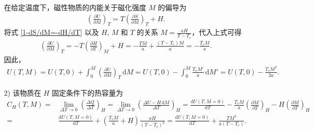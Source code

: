\documentclass{assignment}
\begin{document}
\begin{sol}
\begin{itemize}
        在给定温度下，磁性物质的内能关于磁化强度 $M$ 的偏导为
        \begin{align}
            \left(\frac{\partial U}{\partial M}\right)_T=T\left(\frac{\partial S}{\partial M}\right)_T+H.
        \end{align}
        将式 \eqref{1-dS/dM=-dH/dT} 以及 $H$, $M$ 和 $T$ 的关系 $M=\frac{aH}{T-T_c}$，代入上式可得
        \begin{align}
            \label{1-dU/dM}
            \left(\frac{\partial U}{\partial M}\right)_T=-T\left(\frac{\partial H}{\partial T}\right)_M+H=-\frac{TM}{a}+\frac{(T-T_c)M}{a}=-\frac{T_cM}{a}.
        \end{align}
        因此，
        \begin{align}
            U(T,M)=U(T,0)+\int_0^M\left(\frac{\partial U}{\partial M}\right)_T\,\mathrm{d}M=U(T,0)-\int_0^M\frac{T_cM'}{a}\,\mathrm{d}M'=U(T,0)-\frac{T_cM^2}{2a}.
        \end{align}
        \item[2)] 该物质在 $H$ 固定条件下的热容量为
        \begin{align}
            C_H(T,M)=&\lim_{\Delta T\rightarrow 0}\left(\frac{\Delta Q}{\Delta T}\right)_H=\lim_{\Delta T\rightarrow 0}\left(\frac{\Delta U-H\,\mathrm{d}M}{\Delta T}\right)_H=\frac{\mathrm{d}U(T,M=0)}{\mathrm{d}T}-\frac{T_cM}{a}\left(\frac{\partial M}{\partial T}\right)_H-H\left(\frac{\partial M}{\partial T}\right)_H\\
            =&\frac{\mathrm{d}U(T,M=0)}{\mathrm{d}T}+\left(\frac{T_cM}{a}+H\right)\frac{aH}{(T-T_c)^2}=\frac{\mathrm{d}U(T,M=0)}{\mathrm{d}T}+\frac{TM^2}{a(T-T_c)}.
        \end{align}

\end{itemize}
\end{sol}
\end{document}
